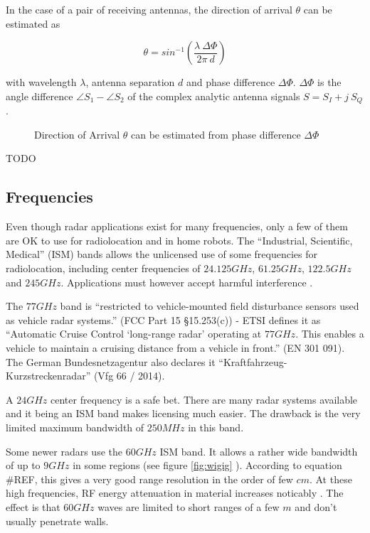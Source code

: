In the case of a pair of receiving antennas, the direction of arrival
\(\theta\) can be estimated \cite{VanZeijl2014} as

\[\theta = sin^{-1}\left({\frac{\lambda~\Delta\Phi}{2\pi ~d}}\right)\]

with wavelength \(\lambda\), antenna separation \(d\) and phase
difference \(\Delta\Phi\). \(\Delta\Phi\) is the angle difference
\(\angle S_1 - \angle S_2\) of the complex analytic antenna signals
\(S = S_I + j~S_Q\).

\begin{figure}[htp]
    \centering
    \label{fig:doa}
    \def\svgwidth{\linewidth}
    
    \caption{Direction of Arrival \(\theta\) can be estimated from phase difference \(\Delta\Phi\)}
\end{figure}

TODO
\cite{Hacker2010} \cite{Cho2017}

\subsection{Frequencies}\label{frequencies}

Even though radar applications exist for many frequencies, only a few of
them are OK to use for radiolocation and in home robots. The
``Industrial, Scientific, Medical'' (ISM) bands allows the unlicensed
use of some frequencies for radiolocation, including center frequencies
of \(24.125 GHz\), \(61.25 GHz\), \(122.5 GHz\) and \(245 GHz\).
Applications must however accept harmful interference \cite{FCC2017}.

The \(77 GHz\) band is ``restricted to vehicle-mounted field disturbance
sensors used as vehicle radar systems.'' (FCC Part 15 §15.253(c)) - ETSI
defines it as ``Automatic Cruise Control `long-range radar' operating at
\(77 GHz\). This enables a vehicle to maintain a cruising distance from
a vehicle in front.'' (EN 301 091). The German Bundesnetzagentur also
declares it ``Kraftfahrzeug-Kurzstreckenradar'' (Vfg 66 / 2014).

A \(24 GHz\) center frequency is a safe bet. There are many radar
systems available and it being an ISM band makes licensing much easier.
The drawback is the very limited maximum bandwidth of \(250MHz\) in this
band.

Some newer radars use the \(60 GHz\) ISM band. It allows a rather wide
bandwidth of up to \(9GHz\) in some regions (see figure \ref{fig:wigig} ).
According to equation \#REF, this gives a very good range resolution in
the order of few \(cm\). At these high frequencies, RF energy
attenuation in material increases noticably \cite{FerrisJr.1998}. The
effect is that \(60GHz\) waves are limited to short ranges of a few
\(m\) and don't usually penetrate walls.

